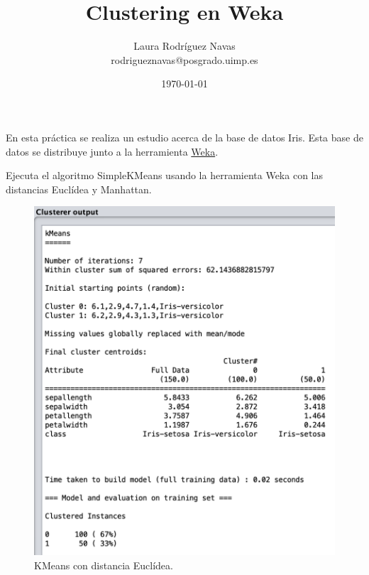 \documentclass[11pt]{exam}
\title{Clustering en Weka}
\author{Laura Rodríguez Navas \\ rodrigueznavas@posgrado.uimp.es}
\date{\today}
\begin{document}
	
\maketitle

En esta práctica se realiza un estudio acerca de la base de datos Iris. Esta base de datos se distribuye junto a la herramienta \href{https://www.cs.waikato.ac.nz/ml/weka/}{Weka}.

\begin{questions}
	
{\question Ejecuta el algoritmo SimpleKMeans usando la herramienta Weka con las distancias Euclídea y Manhattan.}

\renewcommand{\figurename}{Figura}

\begin{figure}[h]
	\centering
	\includegraphics[scale=0.5]{kmeans_euclidea.png}
	\caption{KMeans con distancia Euclídea.}
	\label{Captura_1}
\end{figure}



\end{questions}
\end{document}
